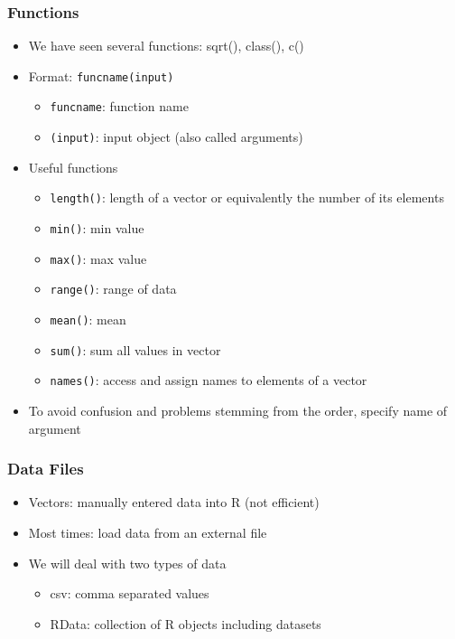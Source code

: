 \documentclass{beamer}
\begin{document}
\begin{frame}
 \frametitle<+->{Functions}
 \begin{itemize}
   \item We have seen several functions: sqrt(), class(), c()
   \item Format: {\tt funcname(input)}
     \begin{itemize}
       \item {\tt funcname}: function name
       \item {\tt (input)}: input object (also called arguments)
     \end{itemize}
   \item Useful functions
     \begin{itemize}
       \item {\tt length()}: length of a vector or equivalently the number of its elements
       \item {\tt min()}: min value
       \item {\tt max()}: max value
       \item {\tt range()}: range of data
       \item {\tt mean()}: mean
       \item {\tt sum()}: sum all values in vector
       \item {\tt names()}: access and assign names to elements of a vector
     \end{itemize}
   \item To avoid confusion and problems stemming from the order, specify name of argument
 \end{itemize}
\end{frame}


\begin{frame}
 \frametitle<+->{Data Files}
 \begin{itemize}
   \item Vectors: manually entered data into R (not efficient)
   \item Most times: load data from an external file
   \item We will deal with two types of data
     \begin{itemize}
       \item csv: comma separated values
       \item RData: collection of R objects including datasets
     \end{itemize}
 \end{itemize}
\end{frame}
\end{document}
